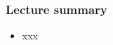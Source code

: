 \documentclass[english,14pt]{beamer}
\begin{document}

\begin{frame}[fragile]

\frametitle{Lecture summary}
\begin{itemize}
	\item xxx
\end{itemize}

\end{frame}
\end{document}
